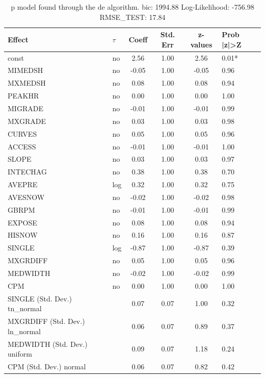 \begin{table}
	\caption{p model found through the de algorithm. bic: 1994.88 Log-Likelihood: -756.98 RMSE_TEST: 17.84}
	\begin{center}
		\begin{tabular}{|l|l|c|c|c|l|}
			\hline
			Effect & $\tau$ & Coeff & Std. Err & z-values & Prob |z|>Z \\
			\hline
			const & no & 2.56 & 1.00 & 2.56 & 0.01* \\
			\hline
			MIMEDSH & no & -0.05 & 1.00 & -0.05 & 0.96 \\
			\hline
			MXMEDSH & no & 0.08 & 1.00 & 0.08 & 0.94 \\
			\hline
			PEAKHR & no & 0.00 & 1.00 & 0.00 & 1.00 \\
			\hline
			MIGRADE & no & -0.01 & 1.00 & -0.01 & 0.99 \\
			\hline
			MXGRADE & no & 0.03 & 1.00 & 0.03 & 0.98 \\
			\hline
			CURVES & no & 0.05 & 1.00 & 0.05 & 0.96 \\
			\hline
			ACCESS & no & -0.01 & 1.00 & -0.01 & 1.00 \\
			\hline
			SLOPE & no & 0.03 & 1.00 & 0.03 & 0.97 \\
			\hline
			INTECHAG & no & 0.38 & 1.00 & 0.38 & 0.70 \\
			\hline
			AVEPRE & log & 0.32 & 1.00 & 0.32 & 0.75 \\
			\hline
			AVESNOW & no & -0.02 & 1.00 & -0.02 & 0.98 \\
			\hline
			GBRPM & no & -0.01 & 1.00 & -0.01 & 0.99 \\
			\hline
			EXPOSE & no & 0.08 & 1.00 & 0.08 & 0.94 \\
			\hline
			HISNOW & no & 0.16 & 1.00 & 0.16 & 0.87 \\
			\hline
			SINGLE & log & -0.87 & 1.00 & -0.87 & 0.39 \\
			\hline
			MXGRDIFF & no & 0.05 & 1.00 & 0.05 & 0.96 \\
			\hline
			MEDWIDTH & no & -0.02 & 1.00 & -0.02 & 0.99 \\
			\hline
			CPM & no & 0.00 & 1.00 & 0.00 & 1.00 \\
			\hline
			SINGLE (Std. Dev.) tn_normal &  & 0.07 & 0.07 & 1.00 & 0.32 \\
			\hline
			MXGRDIFF (Std. Dev.) ln_normal &  & 0.06 & 0.07 & 0.89 & 0.37 \\
			\hline
			MEDWIDTH (Std. Dev.) uniform &  & 0.09 & 0.07 & 1.18 & 0.24 \\
			\hline
			CPM (Std. Dev.) normal &  & 0.06 & 0.07 & 0.82 & 0.42 \\
			\hline
		\end{tabular}
	\end{center}
\end{table}